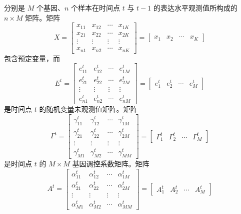 分别是 $M$ 个基因、$n$ 个样本在时间点 $t$ 与 $t-1$ 的表达水平观测值所构成的 $n\times M$ 矩阵。矩阵
\begin{equation}
X=\begin{bmatrix}
x_{11}&x_{12}&\cdots&x_{1K}\\
x_{21}&x_{22}&\cdots&x_{2K}\\
\vdots&\vdots&\vdots&\vdots\\
x_{n1}&x_{n2}&\cdots&x_{nK}
\end{bmatrix}
=\begin{bmatrix}x_1&x_2&\cdots&x_K\end{bmatrix}\tag{4.176}
\end{equation}
包含预定变量，而
\begin{equation}
E^t=\begin{bmatrix}
e_{11}^t&e_{12}^t&\cdots&e_{1M}^t\\
e_{21}^t&e_{22}^t&\cdots&e_{2M}^t\\
\vdots&\vdots&\vdots&\vdots\\
e_{n1}^t&e_{n2}^t&\cdots&e_{nM}^t
\end{bmatrix}
=\begin{bmatrix}e_1^t&e_2^t&\cdots&e_M^t\end{bmatrix}\tag{4.177}
\end{equation}
是时间点 $t$ 的随机变量未观测值矩阵。矩阵
\begin{equation}
\Gamma^t=\begin{bmatrix}
\gamma_{11}^t&\gamma_{12}^t&\cdots&\gamma_{1M}^t\\
\gamma_{21}^t&\gamma_{22}^t&\cdots&\gamma_{2M}^t\\
\vdots&\vdots&\vdots&\vdots\\
\gamma_{M1}^t&\gamma_{M2}^t&\cdots&\gamma_{MM}^t
\end{bmatrix}
=\begin{bmatrix}\Gamma_1^t&\Gamma_2^t&\cdots&\Gamma_M^t\end{bmatrix}\tag{4.178}
\end{equation}
是时间点 $t$ 的 $M\times M$ 基因调控系数矩阵。矩阵
\begin{equation}
A^t=\begin{bmatrix}
\alpha_{11}^t&\alpha_{12}^t&\cdots&\alpha_{1M}^t\\
\alpha_{21}^t&\alpha_{22}^t&\cdots&\alpha_{2M}^t\\
\vdots&\vdots&\vdots&\vdots\\
\alpha_{M1}^t&\alpha_{M2}^t&\cdots&\alpha_{MM}^t
\end{bmatrix}
=\begin{bmatrix}A_1^t&A_2^t&\cdots&A_M^t\end{bmatrix}\tag{4.179}
\end{equation}
